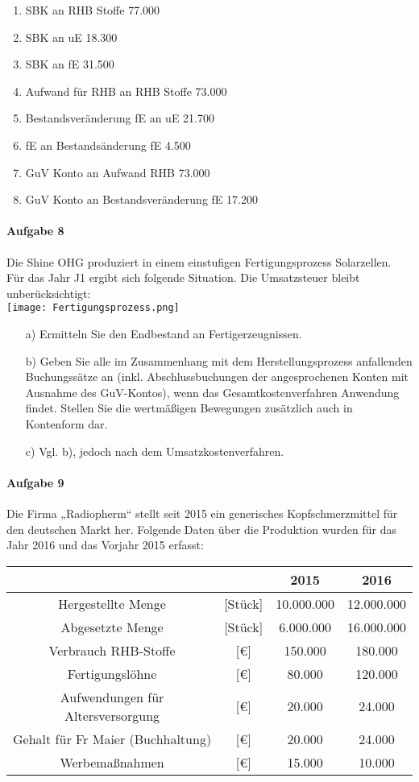 \documentclass[paper=a4, fontsize=11pt]{scrartcl}
\numberwithin{equation}{section}
\numberwithin{figure}{section}
\numberwithin{table}{section}
\begin{document}
\begin{enumerate}
\item SBK an RHB Stoffe 77.000
\item SBK an uE 18.300
\item SBK an fE 31.500
\item Aufwand für RHB an RHB Stoffe 73.000
\item Bestandsveränderung fE an uE 21.700
\item fE an Bestandsänderung fE 4.500
\item GuV Konto an Aufwand RHB 73.000
\item GuV Konto an Bestandsveränderung fE 17.200
\end{enumerate}
\paragraph{Aufgabe 8}
Die Shine OHG produziert in einem einstufigen Fertigungsprozess Solarzellen. Für das Jahr J1 ergibt sich folgende Situation. Die Umsatzsteuer bleibt unberücksichtigt: \\
\texttt{[image: Fertigungsprozess.png]} 
\begin{itemize}
\item[a)] Ermitteln Sie den Endbestand an Fertigerzeugnissen.
\item[b)] Geben Sie alle im Zusammenhang mit dem Herstellungsprozess anfallenden Buchungssätze an (inkl. Abschlussbuchungen der angesprochenen Konten mit Ausnahme des GuV-Kontos), wenn das Gesamtkostenverfahren Anwendung findet. Stellen Sie die wertmäßigen Bewegungen zusätzlich auch in Kontenform dar.
\item[c)] Vgl. b), jedoch nach dem Umsatzkostenverfahren.
\end{itemize}
\paragraph{Aufgabe 9}
Die Firma „Radiopherm“ stellt seit 2015 ein generisches Kopfschmerzmittel für den deutschen Markt her. Folgende Daten über die Produktion wurden für das Jahr 2016 und das Vorjahr 2015 erfasst: \\

\begin{tabular}{|cc|c|c|}
\hline
& & \textbf{2015} & \textbf{2016} \\\hline
Hergestellte Menge & [Stück] & 10.000.000 & 12.000.000  \\\hline 
Abgesetzte Menge & [Stück] & 6.000.000 & 16.000.000  \\\hline 
Verbrauch RHB-Stoffe & [€] & 150.000 & 180.000  \\\hline 
Fertigungslöhne & [€] & 80.000 & 120.000  \\\hline 
Aufwendungen für Altersversorgung & [€] & 20.000 & 24.000  \\\hline 
Gehalt für Fr Maier (Buchhaltung) & [€] & 20.000 & 24.000  \\\hline 
Werbemaßnahmen & [€] & 15.000 & 10.000  \\\hline 
\end{tabular} \\
\end{document}
